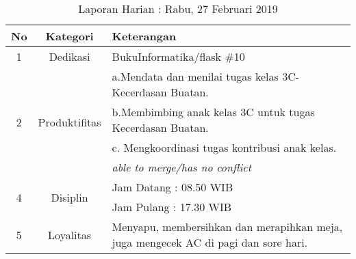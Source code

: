\begin{table}[htp]
\begin{center}
\caption{Laporan Harian : Rabu, 27 Februari 2019}
\label{tab:lh270219}
\begin{tabularx}{\textwidth}{|l|l|X|}
\hline
\multicolumn{1}{|c|}{\textbf{No}} & \multicolumn{1}{c|}{\textbf{Kategori}} & \textbf{Keterangan} \\ \hline
\multicolumn{1}{|c|}{\multirow{1}{*}{1}} & \multicolumn{1}{c|}{\multirow{1}{*}{\parbox{2.5cm}{Dedikasi}}}
& BukuInformatika/flask \#10 \\
\hline
\multicolumn{1}{|c|}{\multirow{4}{*}{2}} & \multicolumn{1}{c|}{\multirow{4}{*}{\parbox{2.5cm}{Produktifitas}}}
& a.Mendata dan menilai tugas kelas 3C-Kecerdasan Buatan.\\
\multicolumn{1}{|c|}{\multirow{1}{*}{}} & \multicolumn{1}{c|}{\multirow{1}{*}{\parbox{2.5cm}{}}}
& b.Membimbing anak kelas 3C untuk tugas Kecerdasan Buatan.\\
\multicolumn{1}{|c|}{\multirow{1}{*}{}} & \multicolumn{1}{c|}{\multirow{1}{*}{\parbox{2.5cm}{}}}
& c. Mengkoordinasi tugas kontribusi anak kelas.\\
\hline
\multicolumn{1}{|c|}{\multirow{1}{*}{3}} & \multicolumn{1}{c|}{\multirow{1}{*}{\parbox{2.5cm}{Integritas}}}
& \textit{able to merge/has no conflict} \\
\hline
\multicolumn{1}{|c|}{\multirow{2}{*}{4}} & \multicolumn{1}{c|}{\multirow{2}{*}{\parbox{2.5cm}{Disiplin}}}
& Jam Datang : 08.50 WIB \\
\multicolumn{1}{|c|}{\multirow{1}{*}{}} & \multicolumn{1}{c|}{\multirow{1}{*}{\parbox{2.5cm}{}}}
& Jam Pulang : 17.30 WIB \\
\hline
\multicolumn{1}{|c|}{\multirow{2}{*}{5}} & \multicolumn{1}{c|}{\multirow{2}{*}{\parbox{2.5cm}{Loyalitas}}}
& Menyapu, membersihkan dan merapihkan meja, juga mengecek AC di pagi dan sore hari.\\
\hline
\end{tabularx}
\end{center}
\end{table}

